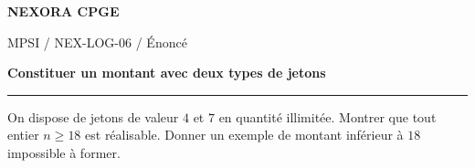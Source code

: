 \documentclass[11pt,a4paper]{article}
\begin{document}
{\small\bfseries\color{nexorablue} NEXORA CPGE}\par
{\small MPSI / NEX-LOG-06 / Énoncé}\par
{\LARGE\bfseries Constituer un montant avec deux types de jetons}\par
\vspace{0.25em}\hrule\vspace{0.6em}

On dispose de jetons de valeur $4$ et $7$ en quantité illimitée. Montrer que tout entier $n\ge18$ est réalisable. Donner un exemple de montant inférieur à $18$ impossible à former.
\end{document}
